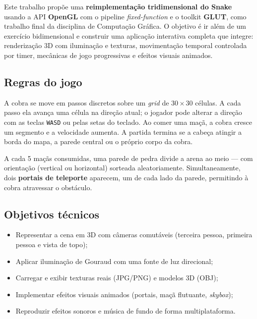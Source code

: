 \documentclass[12pt]{article}
\begin{document}
Este trabalho propõe uma \textbf{reimplementação tridimensional do Snake} usando
a API \textbf{OpenGL} com o pipeline \textit{fixed-function} e o toolkit
\textbf{GLUT}, como trabalho final da disciplina de Computação Gráfica. O
objetivo é ir além de um exercício bidimensional e construir uma aplicação
interativa completa que integre: renderização 3D com iluminação e texturas,
movimentação temporal controlada por timer, mecânicas de jogo progressivas e
efeitos visuais animados.

\subsection*{Regras do jogo}

A cobra se move em passos discretos sobre um \textit{grid} de $30 \times 30$
células. A cada passo ela avança uma célula na direção atual; o jogador pode
alterar a direção com as teclas \texttt{WASD} ou pelas setas do teclado. Ao
comer uma maçã, a cobra cresce um segmento e a velocidade aumenta. A partida
termina se a cabeça atingir a borda do mapa, a parede central ou o próprio corpo
da cobra.

A cada 5 maçãs consumidas, uma parede de pedra divide a arena ao meio — com
orientação (vertical ou horizontal) sorteada aleatoriamente. Simultaneamente,
dois \textbf{portais de teleporte} aparecem, um de cada lado da parede,
permitindo à cobra atravessar o obstáculo.

\subsection*{Objetivos técnicos}

\begin{itemize}
  \item Representar a cena em 3D com câmeras comutáveis (terceira pessoa,
        primeira pessoa e vista de topo);
  \item Aplicar iluminação de Gouraud com uma fonte de luz direcional;
  \item Carregar e exibir texturas reais (JPG/PNG) e modelos 3D (OBJ);
  \item Implementar efeitos visuais animados (portais, maçã flutuante,
        \textit{skybox});
  \item Reproduzir efeitos sonoros e música de fundo de forma multiplataforma.
\end{itemize}

\end{document}
